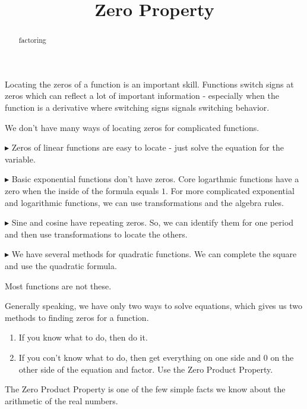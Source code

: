\documentclass{ximera}
\title{Zero Property}
\begin{document}
\begin{abstract}
factoring
\end{abstract}
\maketitle




Locating the zeros of a function is an important skill.  Functions switch signs at zeros which can reflect a lot of important information  - especially when the function is a derivative where switching signs signals switching behavior.

We don't have many ways of locating zeros for complicated functions.


\textbf{\textcolor{blue!55!black}{$\blacktriangleright$}} Zeros of linear functions are easy to locate - just solve the equation for the variable. 


\textbf{\textcolor{blue!55!black}{$\blacktriangleright$}} Basic exponential functions don't have zeros.  Core logarthmic functions have a zero when the inside of the formula equals $1$. For more complicated exponential and logarithmic functions, we can use transformations and the algebra rules. 

\textbf{\textcolor{blue!55!black}{$\blacktriangleright$}} Sine and cosine have repeating zeros. So, we can identify them for one period and then use transformations to locate the others. 

\textbf{\textcolor{blue!55!black}{$\blacktriangleright$}} We have several methods for quadratic functions.  We can complete the square and use the quadratic formula. 

Most functions are not these.

Generally speaking, we have only two ways to solve equations, which gives us two methods to finding zeros for a function.


\begin{enumerate}
\item If you know what to do, then do it.
\item If you con't know what to do, then get everything on one side and $0$ on the other side of the equation and factor. Use the Zero Product Property.
\end{enumerate}





The Zero Product Property is one of the few simple facts we know about the arithmetic of the real numbers.
\end{document}
